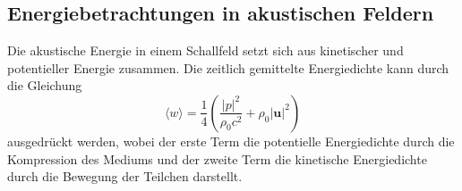  
 
 
 
 
 

\subsection{Energiebetrachtungen in akustischen Feldern
\label{helmholtz:subsection:Energiebetrachtung}}

Die akustische Energie in einem Schallfeld setzt sich aus kinetischer
und potentieller Energie zusammen.
Die zeitlich gemittelte Energiedichte kann durch die Gleichung
\begin{equation}
\langle w \rangle
=
\frac{1}{4}\left(\frac{|p|^2}{\rho_0 c^2} + \rho_0 |\boldsymbol{u}|^2 \right)
\end{equation}
ausgedrückt werden,
wobei der erste Term die potentielle Energiedichte durch die
Kompression des Mediums und der zweite Term die kinetische
Energiedichte durch die Bewegung der Teilchen darstellt.

